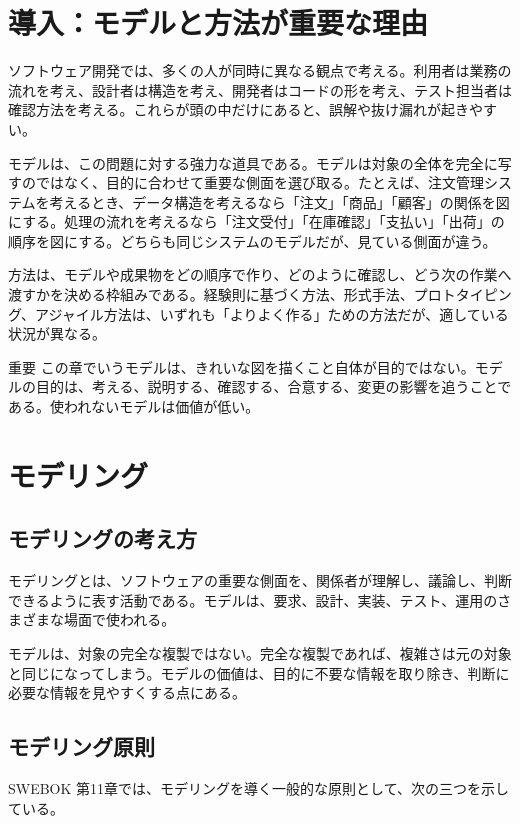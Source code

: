 \documentclass[a4paper,11pt]{ltjsarticle}
\begin{document}
\section*{導入：モデルと方法が重要な理由}
ソフトウェア開発では、多くの人が同時に異なる観点で考える。利用者は業務の流れを考え、設計者は構造を考え、開発者はコードの形を考え、テスト担当者は確認方法を考える。これらが頭の中だけにあると、誤解や抜け漏れが起きやすい。

モデルは、この問題に対する強力な道具である。モデルは対象の全体を完全に写すのではなく、目的に合わせて重要な側面を選び取る。たとえば、注文管理システムを考えるとき、データ構造を考えるなら「注文」「商品」「顧客」の関係を図にする。処理の流れを考えるなら「注文受付」「在庫確認」「支払い」「出荷」の順序を図にする。どちらも同じシステムのモデルだが、見ている側面が違う。

方法は、モデルや成果物をどの順序で作り、どのように確認し、どう次の作業へ渡すかを決める枠組みである。経験則に基づく方法、形式手法、プロトタイピング、アジャイル方法は、いずれも「よりよく作る」ための方法だが、適している状況が異なる。

\begin{pointbox}{重要}
この章でいうモデルは、きれいな図を描くこと自体が目的ではない。モデルの目的は、考える、説明する、確認する、合意する、変更の影響を追うことである。使われないモデルは価値が低い。
\end{pointbox}

\section{モデリング}
\subsection{モデリングの考え方}
モデリングとは、ソフトウェアの重要な側面を、関係者が理解し、議論し、判断できるように表す活動である。モデルは、要求、設計、実装、テスト、運用のさまざまな場面で使われる。

モデルは、対象の完全な複製ではない。完全な複製であれば、複雑さは元の対象と同じになってしまう。モデルの価値は、目的に不要な情報を取り除き、判断に必要な情報を見やすくする点にある。

\subsection{モデリング原則}
SWEBOK 第11章では、モデリングを導く一般的な原則として、次の三つを示している。
\end{document}
